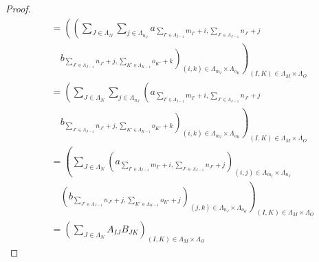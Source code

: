 \documentclass[dvipdfmx]{jsarticle}
\begin{document}
\begin{proof}
\begin{align*}
&= \left( \left( \sum_{J \in \varLambda_{N}} \sum_{j \in \varLambda_{n_{J}}}  a_{\sum_{I' \in \varLambda_{I - 1}} m_{I'} + i,\sum_{J' \in \varLambda_{J - 1}} n_{J'} + j} \right. \right. \\
&\quad \left. \left. b_{\sum_{J' \in \varLambda_{J - 1}} n_{J'} + j,\sum_{K' \in \varLambda_{K - 1}} o_{K'} + k} \right)_{(i,k) \in \varLambda_{m_{I}} \times \varLambda_{o_{K}}} \right)_{(I,K) \in \varLambda_{M} \times \varLambda_{O}}\\
&= \left( \sum_{J \in \varLambda_{N}}  \sum_{j \in \varLambda_{n_{J}}} \left( a_{\sum_{I' \in \varLambda_{I - 1}} m_{I'} + i,\sum_{J' \in \varLambda_{J - 1}} n_{J'} + j} \right. \right. \\
&\quad \left. \left.  b_{\sum_{J' \in \varLambda_{J - 1}} n_{J'} + j,\sum_{K' \in \varLambda_{K - 1}} o_{K'} + k} \right)_{(i,k) \in \varLambda_{m_{I}} \times \varLambda_{o_{K}}} \right)_{(I,K) \in \varLambda_{M} \times \varLambda_{O}}\\
&= \left( \sum_{J \in \varLambda_{N}}  \left( a_{\sum_{I' \in \varLambda_{I - 1}} m_{I'} + i,\sum_{J' \in \varLambda_{J - 1}} n_{J'} + j} \right)_{(i,j) \in \varLambda_{m_{I}} \times \varLambda_{n_{J}}} \right. \\
&\quad \left. \left( b_{\sum_{J' \in \varLambda_{J - 1}} n_{J'} + j,\sum_{K' \in \varLambda_{K - 1}} o_{K'} + j} \right)_{(j,k) \in \varLambda_{n_{J}} \times \varLambda_{o_{K}}} \right)_{(I,K) \in \varLambda_{M} \times \varLambda_{O}}\\
&= \left( \sum_{J \in \varLambda_{N}} {A_{IJ}B_{JK}} \right)_{(I,K) \in \varLambda_{M} \times \varLambda_{O}}
\end{align*}
\end{proof}
\end{document}

